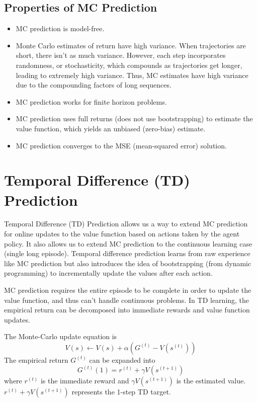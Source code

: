 \documentclass[11pt]{article}
\begin{document}
\subsection{Properties of MC Prediction}
\begin{itemize}
    \item MC prediction is model-free.
    \item Monte Carlo estimates of return have high variance. When trajectories are short, there isn't as much variance. However, each step incorporates randomness, or stochasticity, which compounds as trajectories get longer, leading to extremely high variance. Thus, MC estimates have high variance due to the compounding factors of long sequences. 
    \item MC prediction works for finite horizon problems.
    \item MC prediction uses full returns (does not use bootstrapping) to estimate the value function, which yields an unbiased (zero-bias) estimate.
    \item MC prediction converges to the MSE (mean-squared error) solution. 
\end{itemize}


\section{Temporal Difference (TD) Prediction}
Temporal Difference (TD) Prediction allows us a way to extend MC prediction for online updates to the value function based on actions taken by the agent policy. It also allows us to extend MC prediction to the continuous learning case (single long episode). Temporal difference prediction learns from raw experience like MC prediction but also introduces the idea of bootstrapping (from dynamic programming) to incrementally update the values after each action. 

MC prediction requires the entire episode to be complete in order to update the value function, and thus can't handle continuous problems. In TD learning, the empirical return can be decomposed into immediate rewards and value function updates.

The Monte-Carlo update equation is 
\begin{equation}
    V(s) \leftarrow V(s) + \alpha(G^{(t)}-V(s^{(t)}))
\end{equation}
The empirical return $G^{(t)}$ can be expanded into 
\begin{equation}
    G^{(t)}(1) = r^{(t)} + \gamma V(s^{(t+1)})
\end{equation}
where $r^{(t)}$ is the immediate reward and $\gamma V(s^{(t+1)})$ is the estimated value. $r^{(t)} + \gamma V(s^{(t+1)})$ represents the 1-step TD target.
\end{document}
